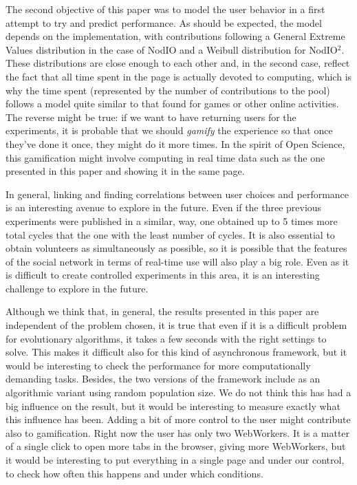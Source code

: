 \documentclass[journal,onecolumn]{IEEEtran}
\begin{document}
The second objective of this paper was to model the user behavior in a
first attempt to try and predict performance. As should be expected,
the model depends on the implementation, with contributions following
a General Extreme Values distribution in the case of {\sf NodIO} and a
Weibull distribution for {\sf NodIO$^2$}. These distributions are
close enough to each other and, in the second case, reflect the fact
that all time spent in the page is actually devoted to computing,
which is why the time spent (represented by the number of
contributions to the pool) follows a model quite similar to that found
for games or other online activities. The reverse might be true: if we
want to have returning users for the experiments, it is probable that
we should {\em gamify} the experience so that once they've done it
once, they might do it more times. In the spirit of Open Science, this
gamification might involve computing in real time data such as the one
presented in this paper and showing it in the same page. 

In general, linking and finding correlations between user choices and
performance is an interesting avenue to explore in the future. Even if
the three previous experiments were published in a similar, way, one
obtained up to 5 times more total cycles  that the one with the least
number of cycles. It is also essential to obtain volunteers as
simultaneously as possible, so it is possible that the features of the
social network in terms of real-time use will also play a big
role. Even as it is difficult to create controlled experiments in this
area, it is an interesting challenge to explore in the future.

Although we think that, in general, the results presented in this
paper are independent of the problem chosen, it is true that even if
it is a difficult problem for evolutionary algorithms, it takes a few
seconds with the right settings to solve. This makes it difficult also
for this kind of asynchronous framework, but it would be interesting
to check the performance for more computationally demanding
tasks. Besides, the two versions of the framework include as an
algorithmic variant using random population size. We do not think this
has had a big influence on the result, but it would be interesting to
measure exactly what this influence has been. Adding a bit of more
control to the user might contribute also to gamification. Right now
the user has only two WebWorkers. It is a matter of a single click to
open more tabs in the browser, giving more WebWorkers, but it would be
interesting to put everything in a single page and under our control,
to check how often this happens and under which conditions. 
\end{document}
